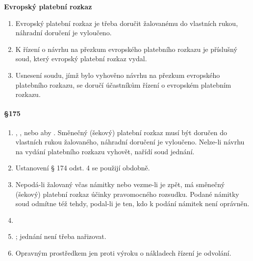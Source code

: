 \hfill\break

\textbf{\Large Evropský platební rozkaz}

\begin{enumerate}[label={(\arabic*)}]
  \item Evropský platební rozkaz je třeba doručit žalovanému do vlastních rukou, náhradní doručení je vyloučeno.
  \item K řízení o návrhu na přezkum evropského platebního rozkazu je příslušný soud, který evropský platební rozkaz vydal.
  \item Usnesení soudu, jímž bylo vyhověno návrhu na přezkum evropského platebního rozkazu, se doručí účastníkům řízení o evropském platebním rozkazu.
\end{enumerate}

\paragraph{\S 175}

\begin{enumerate}[label={(\arabic*)}]
  \item {}, ,  nebo aby . Směnečný (šekový) platební rozkaz musí být doručen do vlastních rukou žalovaného, náhradní doručení je vyloučeno. Nelze-li návrhu na vydání platebního rozkazu vyhovět, nařídí soud jednání.
  \item Ustanovení § 174 odst. 4 se použijí obdobně.
  \item Nepodá-li žalovaný včas námitky nebo vezme-li je zpět, má směnečný (šekový) platební rozkaz účinky pravomocného rozsudku.  Podané námitky soud odmítne též tehdy, podal-li je ten, kdo k podání námitek není oprávněn.
  \item {}
  \item {}; jednání není třeba nařizovat.
  \item Opravným prostředkem jen proti výroku o nákladech řízení je odvolání.
\end{enumerate}

